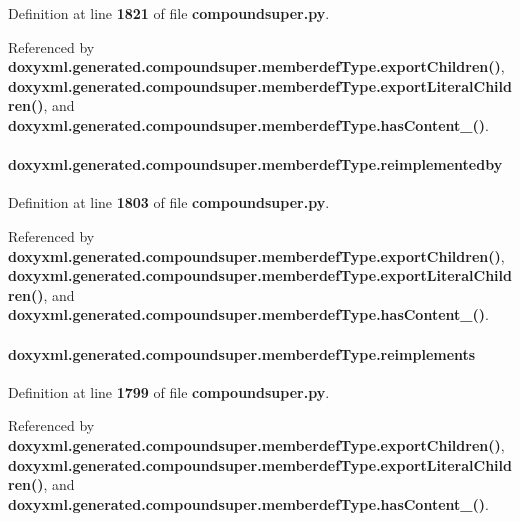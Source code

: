 Definition at line {\bf 1821} of file {\bf compoundsuper.\+py}.



Referenced by {\bf doxyxml.\+generated.\+compoundsuper.\+memberdef\+Type.\+export\+Children()}, {\bf doxyxml.\+generated.\+compoundsuper.\+memberdef\+Type.\+export\+Literal\+Children()}, and {\bf doxyxml.\+generated.\+compoundsuper.\+memberdef\+Type.\+has\+Content\+\_\+()}.

\paragraph[{reimplementedby}]{\setlength{\rightskip}{0pt plus 5cm}doxyxml.\+generated.\+compoundsuper.\+memberdef\+Type.\+reimplementedby}\label{classdoxyxml_1_1generated_1_1compoundsuper_1_1memberdefType_aee7f6b3fd98fbd0026a34d914f16187f}


Definition at line {\bf 1803} of file {\bf compoundsuper.\+py}.



Referenced by {\bf doxyxml.\+generated.\+compoundsuper.\+memberdef\+Type.\+export\+Children()}, {\bf doxyxml.\+generated.\+compoundsuper.\+memberdef\+Type.\+export\+Literal\+Children()}, and {\bf doxyxml.\+generated.\+compoundsuper.\+memberdef\+Type.\+has\+Content\+\_\+()}.

\paragraph[{reimplements}]{\setlength{\rightskip}{0pt plus 5cm}doxyxml.\+generated.\+compoundsuper.\+memberdef\+Type.\+reimplements}\label{classdoxyxml_1_1generated_1_1compoundsuper_1_1memberdefType_a714280614ea635254f97423fee6d0cb7}


Definition at line {\bf 1799} of file {\bf compoundsuper.\+py}.



Referenced by {\bf doxyxml.\+generated.\+compoundsuper.\+memberdef\+Type.\+export\+Children()}, {\bf doxyxml.\+generated.\+compoundsuper.\+memberdef\+Type.\+export\+Literal\+Children()}, and {\bf doxyxml.\+generated.\+compoundsuper.\+memberdef\+Type.\+has\+Content\+\_\+()}.

